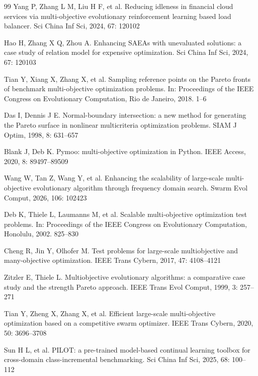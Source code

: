 \documentclass{SCIS2026}
\begin{document}
\begin{thebibliography}{99}
 Yang P, Zhang L M, Liu H F, et al. Reducing idleness in financial cloud services via multi-objective evolutionary reinforcement learning based load balancer. Sci China Inf Sci, 2024, 67: 120102

 Hao H, Zhang X Q, Zhou A. Enhancing SAEAs with unevaluated solutions: a case study of relation model for expensive optimization. Sci China Inf Sci, 2024, 67: 120103

 Tian Y, Xiang X, Zhang X, et al. Sampling reference points on the Pareto fronts of benchmark multi-objective optimization problems. In: Proceedings of the IEEE Congress on Evolutionary Computation, Rio de Janeiro, 2018. 1--6

 Das I, Dennis J E. Normal-boundary intersection: a new method for generating the Pareto surface in nonlinear multicriteria optimization problems. SIAM J Optim, 1998, 8: 631--657

 Blank J, Deb K. Pymoo: multi-objective optimization in Python. IEEE Access, 2020, 8: 89497--89509

 Wang W, Tan Z, Wang Y, et al. Enhancing the scalability of large-scale multi-objective evolutionary algorithm through frequency domain search. Swarm Evol Comput, 2026, 106: 102423

 Deb K, Thiele L, Laumanns M, et al. Scalable multi-objective optimization test problems. In: Proceedings of the IEEE Congress on Evolutionary Computation, Honolulu, 2002. 825--830

 Cheng R, Jin Y, Olhofer M. Test problems for large-scale multiobjective and many-objective optimization. IEEE Trans Cybern, 2017, 47: 4108--4121

 Zitzler E, Thiele L. Multiobjective evolutionary algorithms: a comparative case study and the strength Pareto approach. IEEE Trans Evol Comput, 1999, 3: 257--271

 Tian Y, Zheng X, Zhang X, et al. Efficient large-scale multi-objective optimization based on a competitive swarm optimizer. IEEE Trans Cybern, 2020, 50: 3696--3708

 Sun H L, et al. PILOT: a pre-trained model-based continual learning toolbox for cross-domain class-incremental benchmarking. Sci China Inf Sci, 2025, 68: 100--112
\end{thebibliography}
\end{document}
